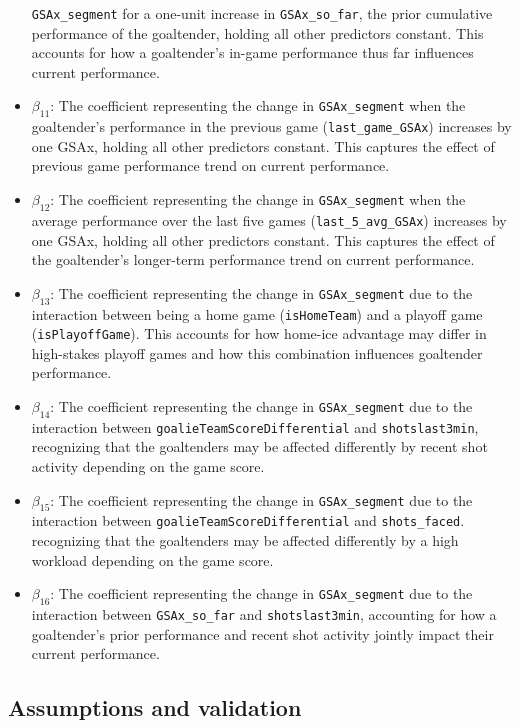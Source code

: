 \documentclass[
  letterpaper,
  DIV=11,
  numbers=noendperiod]{scrartcl}
\begin{document}
\begin{itemize}
  \texttt{GSAx\_segment} for a one-unit increase in
  \texttt{GSAx\_so\_far}, the prior cumulative performance of the
  goaltender, holding all other predictors constant. This accounts for
  how a goaltender's in-game performance thus far influences current
  performance.
\item
  \(\beta_{11}\): The coefficient representing the change in
  \texttt{GSAx\_segment} when the goaltender's performance in the
  previous game (\texttt{last\_game\_GSAx}) increases by one GSAx,
  holding all other predictors constant. This captures the effect of
  previous game performance trend on current performance.
\item
  \(\beta_{12}\): The coefficient representing the change in
  \texttt{GSAx\_segment} when the average performance over the last five
  games (\texttt{last\_5\_avg\_GSAx}) increases by one GSAx, holding all
  other predictors constant. This captures the effect of the
  goaltender's longer-term performance trend on current performance.
\item
  \(\beta_{13}\): The coefficient representing the change in
  \texttt{GSAx\_segment} due to the interaction between being a home
  game (\texttt{isHomeTeam}) and a playoff game
  (\texttt{isPlayoffGame}). This accounts for how home-ice advantage may
  differ in high-stakes playoff games and how this combination
  influences goaltender performance.
\item
  \(\beta_{14}\): The coefficient representing the change in
  \texttt{GSAx\_segment} due to the interaction between
  \texttt{goalieTeamScoreDifferential} and \texttt{shotslast3min},
  recognizing that the goaltenders may be affected differently by recent
  shot activity depending on the game score.
\item
  \(\beta_{15}\): The coefficient representing the change in
  \texttt{GSAx\_segment} due to the interaction between
  \texttt{goalieTeamScoreDifferential} and \texttt{shots\_faced}.
  recognizing that the goaltenders may be affected differently by a high
  workload depending on the game score.
\item
  \(\beta_{16}\): The coefficient representing the change in
  \texttt{GSAx\_segment} due to the interaction between
  \texttt{GSAx\_so\_far} and \texttt{shotslast3min}, accounting for how
  a goaltender's prior performance and recent shot activity jointly
  impact their current performance.
\end{itemize}

\subsection{Assumptions and
validation}\label{assumptions-and-validation}
\end{document}
